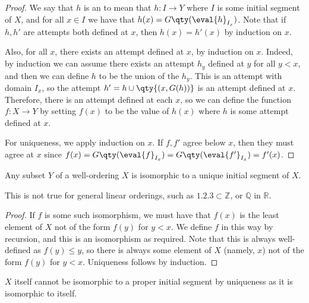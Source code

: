 \begin{proof}
    We say that $h$ is an  to mean that $h \colon I \to Y$ where $I$ is some initial segment of $X$, and for all $x \in I$ we have that $h(x) = G\qty(\eval{h}_{I_x})$.
    Note that if $h, h'$ are attempts both defined at $x$, then $h(x) = h'(x)$ by induction on $x$.

    Also, for all $x$, there exists an attempt defined at $x$, by induction on $x$.
    Indeed, by induction we can assume there exists an attempt $h_y$ defined at $y$ for all $y < x$, and then we can define $h$ to be the union of the $h_y$.
    This is an attempt with domain $I_x$, so the attempt $h' = h \cup \qty{(x, G(h))}$ is an attempt defined at $x$.
    Therefore, there is an attempt defined at each $x$, so we can define the function $f \colon X \to Y$ by setting $f(x)$ to be the value of $h(x)$ where $h$ is some attempt defined at $x$.

    For uniqueness, we apply induction on $x$.
    If $f, f'$ agree below $x$, then they must agree at $x$ since $f(x) = G\qty(\eval{f}_{I_x}) = G\qty(\eval{f'}_{I_x}) = f'(x)$.
\end{proof}
\begin{proposition}
    Any subset $Y$ of a well-ordering $X$ is isomorphic to a unique initial segment of $X$.
\end{proposition}
This is not true for general linear orderings, such as $\qty{1, 2, 3} \subset \mathbb Z$, or $\mathbb Q$ in $\mathbb R$.
\begin{proof}
    If $f$ is some such isomorphism, we must have that $f(x)$ is the least element of $X$ not of the form $f(y)$ for $y < x$.
    We define $f$ in this way by recursion, and this is an isomorphism as required.
    Note that this is always well-defined as $f(y) \leq y$, so there is always some element of $X$ (namely, $x$) not of the form $f(y)$ for $y < x$.
    Uniqueness follows by induction.
\end{proof}
\begin{remark}
    $X$ itself cannot be isomorphic to a proper initial segment by uniqueness as it is isomorphic to itself.
\end{remark}

